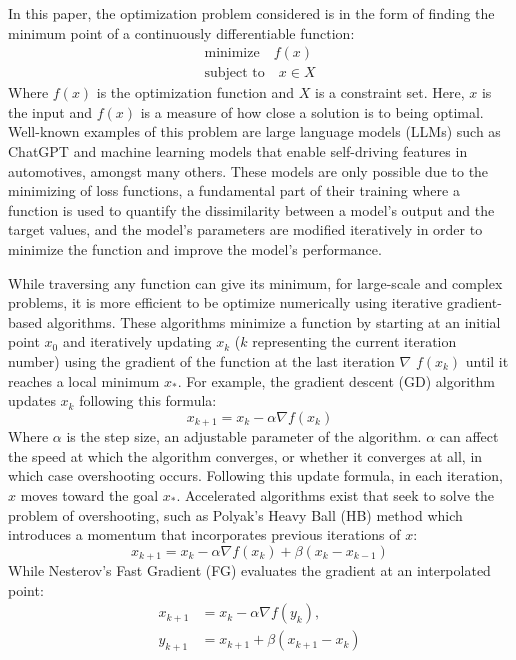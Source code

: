 In this paper, the optimization problem considered is in the form of finding the minimum point of a continuously differentiable function:
\begin{subequations}\label{opt prob}
  \begin{align}
    \textrm{minimize} \quad f(x) \\
    \textrm{subject to} \quad x \in X
  \end{align}
\end{subequations}
Where \(f(x)\) is the optimization function and \(X\) is a constraint set. Here, \(x\) is the input and \(f(x)\) is a measure of how close a solution is to being optimal. Well-known examples of this problem are large language models (LLMs) such as ChatGPT and machine learning models that enable self-driving features in automotives, amongst many others. These models are only possible due to the minimizing of loss functions, a fundamental part of their training where a function is used to quantify the dissimilarity between a model's output and the target values, and the model's parameters are modified iteratively in order to minimize the function and improve the model's performance.

While traversing any function can give its minimum, for large-scale and complex problems, it is more efficient to be optimize numerically using iterative gradient-based  algorithms. These algorithms minimize a function by starting at an initial point \(x_{0}\) and iteratively updating \(x_k\) (\(k\) representing the current iteration number) using the gradient of the function at the last iteration $\nabla$ \(f(x_k)\) until it reaches a local minimum \(x_*\). For example, the gradient descent (GD) algorithm updates \(x_k\) following this formula:
\begin{equation}\label{eqn:GD}
  x_{k+1}=x_{k}-\alpha \nabla f(x_k)
\end{equation}
Where $\alpha$ is the step size, an adjustable parameter of the algorithm. $\alpha$ can affect the speed at which the algorithm converges, or whether it converges at all, in which case overshooting occurs. Following this update formula, in each iteration, \(x\) moves toward the goal \(x_*\). Accelerated algorithms exist that seek to solve the problem of overshooting, such as Polyak’s Heavy Ball (HB) method which introduces a momentum that incorporates previous iterations of \(x\):
\begin{equation}\label{eqn:HB}
  x_{k+1}=x_k-\alpha \nabla f(x_k)+ \beta (x_k-x_{k-1})
\end{equation}
While Nesterov’s Fast Gradient (FG) evaluates the gradient at an interpolated point:
\begin{subequations} \label{eqn:FG}
  \begin{align}
    x_{k+1}     &=x_k-\alpha \nabla f(y_k), \label{eq_state}       \\
    y_{k+1} &=x_{k+1}+\beta (x_{k+1}-x_k) \label{eq_interpolated point}
  \end{align}
  \end{subequations}
